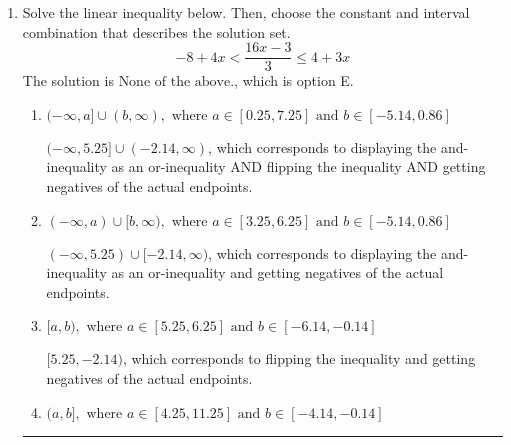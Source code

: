 \documentclass{extbook}[14pt]
\newcommand{\litem}[1]{\item #1

\rule{\textwidth}{0.4pt}}
\begin{document}
\begin{enumerate}
{\begin{enumerate}[label=\Alph*.]
* $(-1.09, 14.50]$, which is the correct option.
\item \( (-\infty, a] \cup (b, \infty), \text{ where } a \in [-3.09, -0.09] \text{ and } b \in [12.5, 19.5] \)

$(-\infty, -1.09] \cup (14.50, \infty)$, which corresponds to displaying the and-inequality as an or-inequality AND flipping the inequality.
\item \( (-\infty, a) \cup [b, \infty), \text{ where } a \in [-1.2, 0.5] \text{ and } b \in [12.5, 20.5] \)

$(-\infty, -1.09) \cup [14.50, \infty)$, which corresponds to displaying the and-inequality as an or-inequality.
\item \( \text{None of the above.} \)


\end{enumerate}

\textbf{General Comment:} To solve, you will need to break up the compound inequality into two inequalities. Be sure to keep track of the inequality! It may be best to draw a number line and graph your solution.
}
\litem{
Solve the linear inequality below. Then, choose the constant and interval combination that describes the solution set.
\[ -8 + 4 x < \frac{16 x - 3}{3} \leq 4 + 3 x \]The solution is \( \text{None of the above.} \), which is option E.\begin{enumerate}[label=\Alph*.]
\item \( (-\infty, a] \cup (b, \infty), \text{ where } a \in [0.25, 7.25] \text{ and } b \in [-5.14, 0.86] \)

$(-\infty, 5.25] \cup (-2.14, \infty)$, which corresponds to displaying the and-inequality as an or-inequality AND flipping the inequality AND getting negatives of the actual endpoints.
\item \( (-\infty, a) \cup [b, \infty), \text{ where } a \in [3.25, 6.25] \text{ and } b \in [-5.14, 0.86] \)

$(-\infty, 5.25) \cup [-2.14, \infty)$, which corresponds to displaying the and-inequality as an or-inequality and getting negatives of the actual endpoints.
\item \( [a, b), \text{ where } a \in [5.25, 6.25] \text{ and } b \in [-6.14, -0.14] \)

$[5.25, -2.14)$, which corresponds to flipping the inequality and getting negatives of the actual endpoints.
\item \( (a, b], \text{ where } a \in [4.25, 11.25] \text{ and } b \in [-4.14, -0.14] \)


\end{enumerate}}
\end{enumerate}
\end{document}
